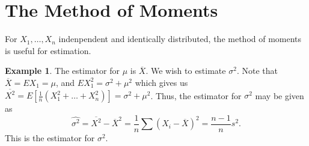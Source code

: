 \documentclass[15pt,a4paper]{book}
\theoremstyle{definition}
\newtheorem{example}[theorem]{Example}
\begin{document}
\section{The Method of Moments}
For $X_{1},\ldots,X_{n}$ indenpendent and identically distributed, the method of moments is useful for estimation.
\begin{example}
    The estimator for $\mu$ is $\overline{X}$. We wish to estimate $\sigma^{2}$. Note that $\overline{X} = EX_{1} = \mu$, and $EX_{1}^{2} = \sigma^{2} + \mu^{2}$ which gives us $\overline{X^{2}} = E[\frac{1}{n}(X_{1}^{2}+\ldots+X_{n}^{2})] = \sigma^{2}+\mu^{2}$. Thus, the estimator for $\sigma^{2}$ may be given as
    \begin{equation}
        \hat{\sigma^{2}} = \overline{{X}^{2}} - \overline{X}^{2} = \frac{1}{n} \sum (X_{i} - \overline{X})^{2} = \frac{n-1}{n} s^{2}.
    \end{equation}
    This is the estimator for $\sigma^{2}$.
\end{example}


\end{document}
